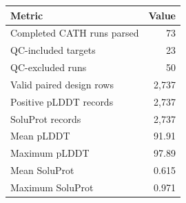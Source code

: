 \begin{tabular}{lr}
\toprule
Metric & Value \\
\midrule
Completed CATH runs parsed & 73 \\
QC-included targets & 23 \\
QC-excluded runs & 50 \\
Valid paired design rows & 2,737 \\
Positive pLDDT records & 2,737 \\
SoluProt records & 2,737 \\
Mean pLDDT & 91.91 \\
Maximum pLDDT & 97.89 \\
Mean SoluProt & 0.615 \\
Maximum SoluProt & 0.971 \\
\bottomrule
\end{tabular}

